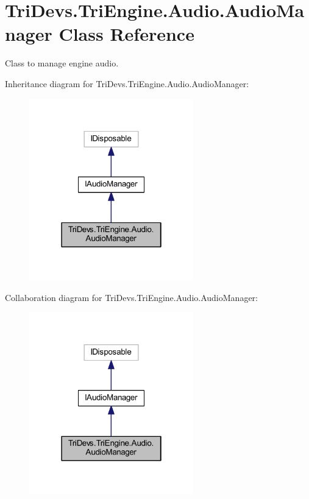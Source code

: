 \hypertarget{class_tri_devs_1_1_tri_engine_1_1_audio_1_1_audio_manager}{\section{Tri\-Devs.\-Tri\-Engine.\-Audio.\-Audio\-Manager Class Reference}
\label{class_tri_devs_1_1_tri_engine_1_1_audio_1_1_audio_manager}
}


Class to manage engine audio.  




Inheritance diagram for Tri\-Devs.\-Tri\-Engine.\-Audio.\-Audio\-Manager\-:
\nopagebreak
\begin{figure}[H]
\begin{center}
\leavevmode
\includegraphics[width=202pt]{class_tri_devs_1_1_tri_engine_1_1_audio_1_1_audio_manager__inherit__graph}
\end{center}
\end{figure}


Collaboration diagram for Tri\-Devs.\-Tri\-Engine.\-Audio.\-Audio\-Manager\-:
\nopagebreak
\begin{figure}[H]
\begin{center}
\leavevmode
\includegraphics[width=202pt]{class_tri_devs_1_1_tri_engine_1_1_audio_1_1_audio_manager__coll__graph}
\end{center}
\end{figure}
